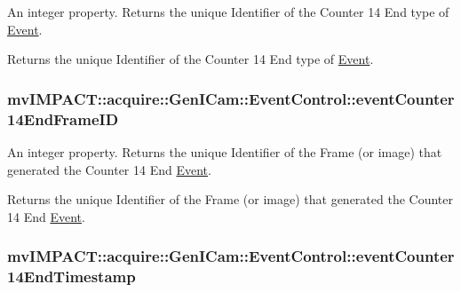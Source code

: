An integer property. Returns the unique Identifier of the Counter 14 End type of \hyperlink{classmv_i_m_p_a_c_t_1_1acquire_1_1_event}{Event}. 

Returns the unique Identifier of the Counter 14 End type of \hyperlink{classmv_i_m_p_a_c_t_1_1acquire_1_1_event}{Event}. \hypertarget{classmv_i_m_p_a_c_t_1_1acquire_1_1_gen_i_cam_1_1_event_control_aba01a0916add9fe22e00297825ca41aa}{
\subsubsection[{event\+Counter14\+End\+Frame\+I\+D}]{ mv\+I\+M\+P\+A\+C\+T\+::acquire\+::\+Gen\+I\+Cam\+::\+Event\+Control\+::event\+Counter14\+End\+Frame\+I\+D}}\label{classmv_i_m_p_a_c_t_1_1acquire_1_1_gen_i_cam_1_1_event_control_aba01a0916add9fe22e00297825ca41aa}


An integer property. Returns the unique Identifier of the Frame (or image) that generated the Counter 14 End \hyperlink{classmv_i_m_p_a_c_t_1_1acquire_1_1_event}{Event}. 

Returns the unique Identifier of the Frame (or image) that generated the Counter 14 End \hyperlink{classmv_i_m_p_a_c_t_1_1acquire_1_1_event}{Event}. \hypertarget{classmv_i_m_p_a_c_t_1_1acquire_1_1_gen_i_cam_1_1_event_control_a880e92a1733c2676fed0ae73aab241b5}{
\subsubsection[{event\+Counter14\+End\+Timestamp}]{ mv\+I\+M\+P\+A\+C\+T\+::acquire\+::\+Gen\+I\+Cam\+::\+Event\+Control\+::event\+Counter14\+End\+Timestamp}}\label{classmv_i_m_p_a_c_t_1_1acquire_1_1_gen_i_cam_1_1_event_control_a880e92a1733c2676fed0ae73aab241b5}



